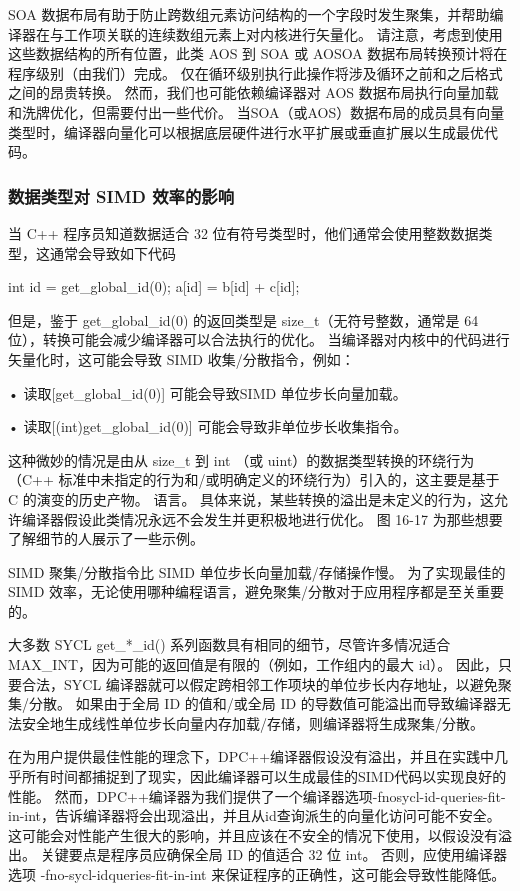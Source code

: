SOA 数据布局有助于防止跨数组元素访问结构的一个字段时发生聚集，并帮助编译器在与工作项关联的连续数组元素上对内核进行矢量化。 请注意，考虑到使用这些数据结构的所有位置，此类 AOS 到 SOA 或 AOSOA 数据布局转换预计将在程序级别（由我们）完成。 仅在循环级别执行此操作将涉及循环之前和之后格式之间的昂贵转换。 然而，我们也可能依赖编译器对 AOS 数据布局执行向量加载和洗牌优化，但需要付出一些代价。 当SOA（或AOS）数据布局的成员具有向量类型时，编译器向量化可以根据底层硬件进行水平扩展或垂直扩展以生成最优代码。

\subsubsection{数据类型对 SIMD 效率的影响}
当 C++ 程序员知道数据适合 32 位有符号类型时，他们通常会使用整数数据类型，这通常会导致如下代码

int id = get\_global\_id(0); a[id] = b[id] + c[id];

但是，鉴于 get\_global\_id(0) 的返回类型是 size\_t（无符号整数，通常是 64 位），转换可能会减少编译器可以合法执行的优化。 当编译器对内核中的代码进行矢量化时，这可能会导致 SIMD 收集/分散指令，例如：

• 读取[get\_global\_id(0)] 可能会导致SIMD 单位步长向量加载。

• 读取[(int)get\_global\_id(0)] 可能会导致非单位步长收集指令。

这种微妙的情况是由从 size\_t 到 int （或 uint）的数据类型转换的环绕行为（C++ 标准中未指定的行为和/或明确定义的环绕行为）引入的，这主要是基于 C 的演变的历史产物。 语言。 具体来说，某些转换的溢出是未定义的行为，这允许编译器假设此类情况永远不会发生并更积极地进行优化。 图 16-17 为那些想要了解细节的人展示了一些示例。

SIMD 聚集/分散指令比 SIMD 单位步长向量加载/存储操作慢。 为了实现最佳的 SIMD 效率，无论使用哪种编程语言，避免聚集/分散对于应用程序都是至关重要的。

大多数 SYCL get\_*\_id() 系列函数具有相同的细节，尽管许多情况适合 MAX\_INT，因为可能的返回值是有限的（例如，工作组内的最大 id）。 因此，只要合法，SYCL 编译器就可以假定跨相邻工作项块的单位步长内存地址，以避免聚集/分散。 如果由于全局 ID 的值和/或全局 ID 的导数值可能溢出而导致编译器无法安全地生成线性单位步长向量内存加载/存储，则编译器将生成聚集/分散。

在为用户提供最佳性能的理念下，DPC++编译器假设没有溢出，并且在实践中几乎所有时间都捕捉到了现实，因此编译器可以生成最佳的SIMD代码以实现良好的性能。 然而，DPC++编译器为我们提供了一个编译器选项-fnosycl-id-queries-fit-in-int，告诉编译器将会出现溢出，并且从id查询派生的向量化访问可能不安全。 这可能会对性能产生很大的影响，并且应该在不安全的情况下使用，以假设没有溢出。 关键要点是程序员应确保全局 ID 的值适合 32 位 int。 否则，应使用编译器选项 -fno-sycl-idqueries-fit-in-int 来保证程序的正确性，这可能会导致性能降低。

